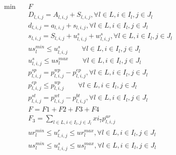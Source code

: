 \begin{align}
  \min\quad & F \tag{eq\_0032\_a} \\
  & D_{l , i , j} = A_{l , i , j} + S_{l , i , j} , \forall l \in L , i \in I_{l} , j \in J_{l} \tag{eq\_0001} \\
  & d_{l , i , j} = a_{l , i , j} + s_{l , i , j} , \forall l \in L , i \in I_{l} , j \in J_{l} \tag{eq\_0005} \\
  & s_{l , i , j} = S_{l , i , j} + u_{l , i , j}^{s} + w_{l , i , j}^{s} , \forall l \in L , i \in I_{l} , j \in J_{l} \tag{eq\_0008} \\
  & us_{l}^{min} \le u_{l,i,j}^{s} \qquad \forall l \in L, i \in I_{l}, j \in J_{l} \tag{eq\_0010\_a} \\
  & u_{l,i,j}^{s} \le us_{l}^{max} \qquad \forall l \in L, i \in I_{l}, j \in J_{l} \tag{eq\_0010\_b} \\
  & p_{l , i , j}^{s p} = p_{l , i , j}^{w p} - p_{l , i , j}^{e p} , \forall l \in L , i \in I_{l} , j \in J_{l} \tag{eq\_0016} \\
  & p_{l,i,j}^{ep} \le p_{l,i,j}^{wp} \qquad \forall l \in L, i \in I_{l}, j \in J_{l} \tag{eq\_0019} \\
  & p_{l , i , j}^{s t} = p_{l , i , j}^{w t} - p_{l , i , j}^{b t} , \forall l \in L , i \in I_{l} , j \in J_{l} \tag{eq\_0027} \\
  & F = F1 + F2 + F3 + F4 \tag{eq\_0032\_b} \\
  & F_{3} = \sum_{l \in L, i \in I_{l}, j \in J_{l}} \mathit{xi}_{7} p_{l , i , j}^{a r} \tag{eq\_0035} \\
  & \mathit{ur}_{l}^{min} \leq u_{l , i , j}^{r} \leq \mathit{ur}_{l}^{max} , \forall l \in L , i \in I_{l} , j \in J_{l} \tag{eq\_0042} \\
  & \mathit{us}_{l}^{min} \leq u_{l , i , j}^{s} \leq \mathit{us}_{l}^{max} , \forall l \in L , i \in I_{l} , j \in J_{l} \tag{eq\_0043} \\
\end{align}
